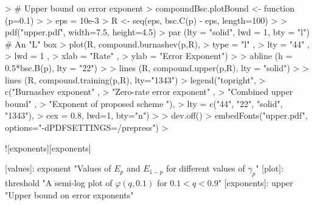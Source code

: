 \begin{Schunk}
\begin{Sinput}
> # Upper bound on error exponent 
> compoundBsc.plotBound <- function (p=0.1)
> {
>   eps = 10e-3
>   R <- seq(eps, bsc.C(p) - eps, length=100)
> 
>   pdf("upper.pdf", width=7.5, height=4.5)
>   par (lty = "solid", lwd = 1, bty = "l")           # An "L" box
>   plot(R, compound.burnashev(p,R), 
>        type = "l"  ,
>        lty  = "44" ,
>        lwd  = 1    ,
>        xlab = "Rate" ,
>        ylab = "Error Exponent")
> 
>   abline (h = 0.5*bsc.B(p), lty = "22")
> 
>   lines (R, compound.upper(p,R), lty = "solid")
> 
>   lines (R, compound.training(p,R), lty="1343") 
>   legend("topright",
>          c("Burnashev exponent"          ,
>            "Zero-rate error exponent"    , 
>            "Combined upper bound"        ,
>            "Exponent of proposed scheme "),
>         lty = c("44", "22", "solid", "1343"),
>         cex = 0.8, lwd=1, bty="n")
> 
>   dev.off()
>   embedFonts("upper.pdf", options="-dPDFSETTINGS=/prepress")
> }
\end{Sinput}
\end{Schunk}


![exponents][exponents]

[values]: exponent "Values of $E_p$ and $E_{1-p}$ for different values of $γ_p$"
[plot]: threshold "A semi-log plot of $φ(q,0.1)$ for $0.1 < q < 0.9$"
[exponents]: upper "Upper bound on error exponents"
    
  
